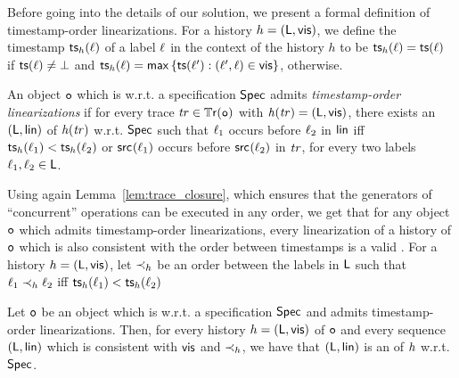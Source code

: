 Before going into the details of our solution, we present a formal definition of timestamp-order linearizations. For a history ${h}=(\mathsf{L},\mathsf{vis})$, we define the timestamp $\mathsf{ts}_{{h}}(\ell)$ of a label $\ell$ in the context of the history $h$ to be $\mathsf{ts}_{{h}}(\ell)=\mathsf{ts}(\ell)$ if $\mathsf{ts}(\ell)\neq\bot$ and $\mathsf{ts}_{{h}}(\ell)=\mathsf{max}\, \{\mathsf{ts}(\ell'):(\ell',\ell)\in \mathsf{vis} \}$, otherwise.

\begin{definition}
An object $\mathtt{o}$ which is \crdtlinearizable{} w.r.t. a specification $\mathsf{Spec}$ admits \emph{timestamp-order linearizations} if for every trace $\mathit{tr}\in\mathbb{T}\mathsf{r}(\mathtt{o})$ with $\mathit{h}({\mathit{tr})}=(\mathsf{L},\mathsf{vis})$, there exists an \crdtlinearization{} $(\mathsf{L},\mathsf{lin})$ of $\mathit{h}({\mathit{tr})}$ w.r.t. $\mathsf{Spec}$ such that $\ell_1$ occurs before $\ell_2$ in $\mathsf{lin}$ iff $\mathsf{ts}_{{h}}(\ell_1) < \mathsf{ts}_{{h}}(\ell_2)$ or $\mathsf{src}_{}(\ell_1)$ occurs before $\mathsf{src}_{}(\ell_2)$ in $\mathit{tr}$, for every two labels $\ell_1,\ell_2\in\mathsf{L}$.
\end{definition}

Using again Lemma~\ref{lem:trace_closure}, which ensures that the generators of ``concurrent'' operations can be executed in any order, we get that for any \crdtlinearizable{} object $\mathtt{o}$ which admits timestamp-order linearizations, every linearization of a history of $\mathtt{o}$ which is also consistent with the order between timestamps is a valid \crdtlinearization{}.
For a history ${h}=(\mathsf{L},\mathsf{vis})$, let $\prec_{{h}}$ be an order between the labels in $\mathsf{L}$ such that $\ell_1\prec_{{h}}\ell_2$ iff $\mathsf{ts}_{{h}}(\ell_1) < \mathsf{ts}_{{h}}(\ell_2)$

\begin{lemma}
Let $\mathtt{o}$ be an object which is \crdtlinearizable{} w.r.t. a specification $\mathsf{Spec}$ and admits timestamp-order linearizations. Then, for every history ${h}=(\mathsf{L},\mathsf{vis})$ of $\mathtt{o}$ and every sequence $(\mathsf{L},\mathsf{lin})$ which is consistent with $\mathsf{vis}$ and $\prec_{{h}}$, we have that $(\mathsf{L},\mathsf{lin})$ is an \crdtlinearization{} of ${h}$ w.r.t. $\mathsf{Spec}$.
\end{lemma}

